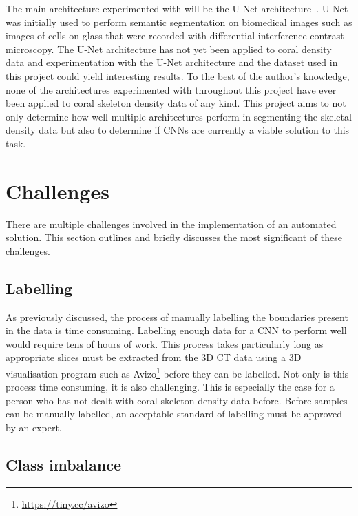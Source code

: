 The main architecture experimented with will be the U-Net architecture~\cite{ronneberger2015u}. U-Net was initially used to perform semantic segmentation on biomedical images such as images of cells on glass that were recorded with differential interference contrast microscopy. The U-Net architecture has not yet been applied to coral density data and experimentation with the U-Net architecture and the dataset used in this project could yield interesting results. To the best of the author's knowledge, none of the architectures experimented with throughout this project have ever been applied to coral skeleton density data of any kind. This project aims to not only determine how well multiple architectures perform in segmenting the skeletal density data but also to determine if CNNs are currently a viable solution to this task.

\section{Challenges}
\label{sec:challenges}

There are multiple challenges involved in the implementation of an automated solution. This section outlines and briefly discusses the most significant of these challenges.

\subsection{Labelling}

As previously discussed, the process of manually labelling the boundaries present in the data is time consuming. Labelling enough data for a CNN to perform well would require tens of hours of work. This process takes particularly long as appropriate slices must be extracted from the 3D CT data using a 3D visualisation program such as Avizo\footnote{\url{https://tiny.cc/avizo}} before they can be labelled. Not only is this process time consuming, it is also challenging. This is especially the case for a person who has not dealt with coral skeleton density data before. Before samples can be manually labelled, an acceptable standard of labelling must be approved by an expert.

\subsection{Class imbalance}

